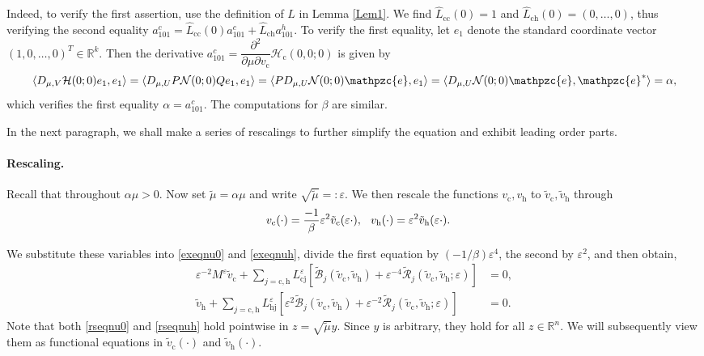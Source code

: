 \documentclass[10pt]{article}
\newcommand{\R}{\mathbb{R}}
\newcommand{\eps}{\varepsilon}
\newcommand{\Nl}{\mathcal{N}}
\newcommand{\B}{\mathcal{B}}
\newcommand{\e}{\mathpzc{e}}
\newcommand{\Rm}{\mathcal{R}}
\begin{document}
Indeed, to verify the first assertion, use the definition of $L$ in Lemma \ref{Lem1}.  We find $\widehat{L}_\mathrm{cc}(0)=1$ and $\widehat{L}_\mathrm{ch}(0)=(0,\ldots,0)$, thus verifying the second equality $a_{101}^c=\widehat{L}_\mathrm{cc}(0)a_{101}^c+\widehat{L}_\mathrm{ch}a_{101}^h$. 
To verify the first equality, let $e_1$ denote the standard coordinate vector $(1,0,\ldots,0)^T \in \R^k$. Then the derivative 
$a_{101}^c=\dfrac{\partial^2}{\partial \mu \partial v_\mathrm{c}}  \mathcal{H}_\mathrm{c}(0,0;0)$ is given by
\[
\langle D_{\mu,V}\mathcal{H}(0;0)e_1,e_1\rangle=\langle D_{\mu,U} P\Nl(0;0)Q e_1,e_1\rangle = \langle PD_{\mu,U}\Nl(0;0) {\e},e_1\rangle  = \langle D_{\mu,U}\Nl(0;0){\e},{\e}^*\rangle = \alpha,
\]
which verifies the first equality $\alpha=a_{101}^c$. The computations for $\beta$ are similar.

In the next paragraph, we shall make a series of rescalings to further simplify the equation and exhibit leading order parts.

\paragraph{Rescaling.} Recall that throughout $\alpha \mu > 0$. Now set $\tilde{\mu} = \alpha \mu$ and write $\sqrt{\tilde{\mu}} =: \eps$. We then rescale the functions $v_\mathrm{c}, v_\mathrm{h}$ to $\tilde{v}_\mathrm{c},\tilde{v}_\mathrm{h}$ through 
\[
\hspace{0.1in} v_\mathrm{c}(\cdot)=\frac{-1}{\beta}\eps^2\tilde{v}_\mathrm{c}(\eps \cdot), \hspace{0.1in} v_\mathrm{h}(\cdot)=\eps^2 \tilde{v}_\mathrm{h}(\eps \cdot).
\]


We substitute these variables into \eqref{exeqnu0} and \eqref{exeqnuh}, divide the first equation by $(-1/\beta)\eps^4$, the second by $\eps^2$, and then obtain,
\begin{align}
\eps^{-2}M^\eps \tilde{v}_\mathrm{c} + \sum_{j=\mathrm{c,h}} L_\mathrm{cj}^{\eps}[\tilde{\B}_j(\tilde{v}_\mathrm{c},\tilde{v}_\mathrm{h})+\eps^{-4}\tilde{\Rm}_j(\tilde{v}_\mathrm{c},\tilde{v}_\mathrm{h};\eps)]&=0,\label{rseqnu0}\\
\tilde{v}_\mathrm{h} +\sum_{j=\mathrm{c,h}} L_\mathrm{hj}^{\eps}[\eps^2\tilde{\B}_j(\tilde{v}_\mathrm{c},\tilde{v}_\mathrm{h})+\eps^{-2}\tilde{\Rm}_j(\tilde{v}_\mathrm{c},\tilde{v}_\mathrm{h};\eps)] &= 0. \label{rseqnuh}
\end{align}
Note that both \eqref{rseqnu0} and \eqref{rseqnuh} hold pointwise in $z = \sqrt{\tilde{\mu}} y$. Since $y$ is arbitrary, they hold for all $z \in \R^n$. We will subsequently view them as functional equations in $\tilde{v}_\mathrm{c}(\cdot)$ and $\tilde{v}_\mathrm{h}(\cdot)$.
\end{document}
